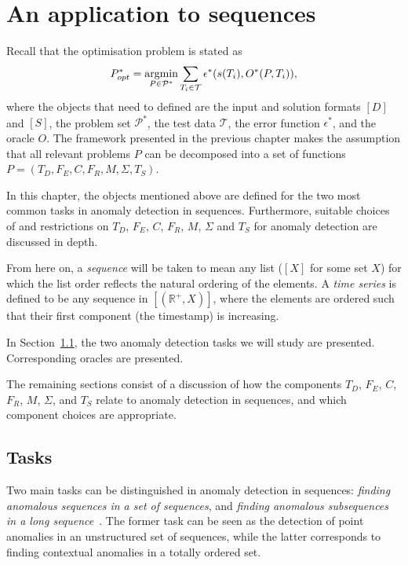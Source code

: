 \chapter{An application to sequences}
\label{ch:time_series}

Recall that the optimisation problem is stated as
\[
    P^*_{opt} = \argmin_{P \in \mathcal{P}^*} \sum_{T_i \in \mathcal{T}} \epsilon^*(s(T_i), O^*(P, T_i)),
\]
where the objects that need to defined are the input and solution formats $[D]$ and $[S]$, the problem set $\mathcal{P}^*$, the test data $\mathcal{T}$, the error function $\epsilon^*$, and the oracle $O$. The framework presented in the previous chapter makes the assumption that all relevant problems $P$ can be decomposed into a set of functions $P = (T_D, F_E, C, F_R, M, \Sigma, T_S)$.

In this chapter, the objects mentioned above are defined for the two most common tasks in anomaly detection in sequences. Furthermore, suitable choices of and restrictions on $T_D$, $F_E$, $C$, $F_R$, $M$, $\Sigma$ and $T_S$ for anomaly detection are discussed in depth.

From here on, a \emph{sequence} will be taken to mean any list ($[X]$ for some set $X$) for which the list order reflects the natural ordering of the elements. A \emph{time series} is defined to be any sequence in $[(\mathbb{R}^+, X)]$, where the elements are ordered such that their first component (the timestamp) is increasing.

In Section~\ref{sect:tasks}, the two anomaly detection tasks we will study are presented. Corresponding oracles are presented.

The remaining sections consist of a discussion of how the components $T_D$, $F_E$, $C$, $F_R$, $M$, $\Sigma$, and $T_S$ relate to anomaly detection in sequences, and which component choices are appropriate.

\section{Tasks}
\label{sect:tasks}

Two main tasks can be distinguished in anomaly detection in sequences: \emph{finding anomalous sequences in a set of sequences}, and \emph{finding anomalous subsequences in a long sequence}~\cite{chandola}. The former task can be seen as the detection of point anomalies in an unstructured set of sequences, while the latter corresponds to finding contextual anomalies in a totally ordered set.

